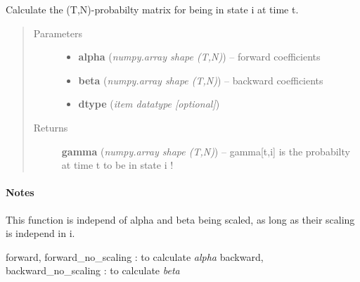 \documentclass[letterpaper,10pt,english]{sphinxmanual}
\begin{document}
\begin{fulllineitems}
\label{hmm:kernel.python.state_probabilities}
Calculate the (T,N)-probabilty matrix for being in state i at time t.
\begin{quote}\begin{description}
\item[{Parameters}] \leavevmode\begin{itemize}
\item {} 
\textbf{alpha} (\emph{numpy.array shape (T,N)}) --
forward coefficients

\item {} 
\textbf{beta} (\emph{numpy.array shape (T,N)}) --
backward coefficients

\item {} 
\textbf{dtype} (\emph{item datatype {[}optional{]}})

\end{itemize}

\item[{Returns}] \leavevmode
\textbf{gamma} (\emph{numpy.array shape (T,N)}) --
gamma{[}t,i{]} is the probabilty at time t to be in state i !

\end{description}\end{quote}
\paragraph{Notes}

This function is independ of alpha and beta being scaled, as long as their
scaling is independ in i.




forward, forward\_no\_scaling : to calculate \emph{alpha}
backward, backward\_no\_scaling : to calculate \emph{beta}



\end{fulllineitems}

\end{document}
